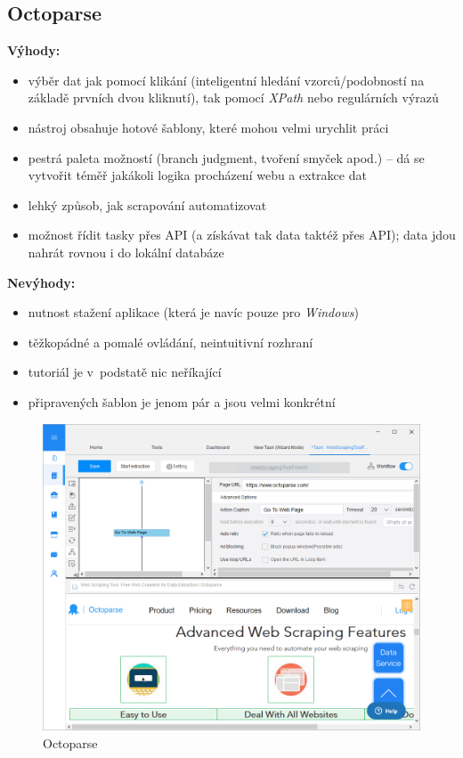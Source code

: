 \documentclass[thesis=B,czech]{FITthesis}[2012/06/26]
\begin{document}
\subsection{Octoparse}
\textbf{Výhody:}
\begin{itemize}
	\item výběr dat jak pomocí klikání (inteligentní hledání vzorců/podobností na základě prvních dvou kliknutí), tak pomocí \emph{XPath} nebo regulárních výrazů
	\item nástroj obsahuje hotové šablony, které mohou velmi urychlit práci
	\item pestrá paleta možností (branch judgment, tvoření smyček apod.) -- dá se vytvořit téměř jakákoli logika procházení webu a extrakce dat
	\item lehký způsob, jak scrapování automatizovat
	\item možnost řídit tasky přes API (a získávat tak data taktéž přes API); data jdou nahrát rovnou i do lokální databáze
\end{itemize}
\textbf{Nevýhody:}
\begin{itemize}
	\item nutnost stažení aplikace (která je navíc pouze pro \emph{Windows})
	\item těžkopádné a pomalé ovládání, neintuitivní rozhraní
	\item tutoriál je v~podstatě nic neříkající
	\item připravených šablon je jenom pár a jsou velmi konkrétní
\end{itemize}
\begin{figure}[h]
	\includegraphics[width=\linewidth]{images/Octoparse.png}
	\caption{Octoparse}
	\label{fig:octoparse}
\end{figure}
\end{document}
